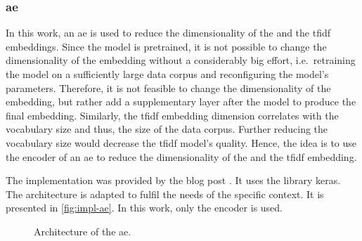 \subsubsection*{\acl{ae}}\label{subsubsec:impl-autoencoder}

In this work, an \ac{ae} is used to reduce the dimensionality of the \infersent{} and the \ac{tfidf} embeddings.
Since the \infersent{} model is pretrained, it is not possible to change the dimensionality of the embedding without a considerably big effort,
i.e.\ retraining the model on a sufficiently large data corpus and reconfiguring the model's parameters.
Therefore, it is not feasible to change the dimensionality of the \infersent{} embedding, but rather add a supplementary layer after the model 
to produce the final embedding.
Similarly, the \ac{tfidf} embedding dimension correlates with the vocabulary size and thus, the size of the data corpus.
Further reducing the vocabulary size would decrease the \ac{tfidf} model's quality.
Hence, the idea is to use the encoder of an \ac{ae} to reduce the dimensionality of the \infersent{} and the \ac{tfidf} embedding.

The implementation was provided by the blog post \cite{impl-src-ae}.
It uses the library keras.
The architecture is adapted to fulfil the needs of the specific context.
It is presented in \autoref{fig:impl-ae}.
In this work, only the encoder is used.
%     

\begin{figure}[!htb] %
    \centering
    
    \caption[Architecture of the \acs*{ae}]{Architecture of the \acs*{ae}.}
    \label{fig:impl-ae}
\end{figure}